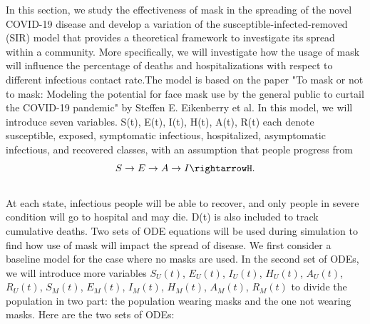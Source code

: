 \documentclass{article}
\begin{document}
In this section, we study the effectiveness of mask in the spreading of the novel COVID-19 disease and develop a variation of the susceptible-infected-removed (SIR) model that provides a theoretical framework to investigate its spread within a community. More specifically, we will investigate how the usage of mask will influence the percentage of deaths and hospitalizations with respect to different infectious contact rate.The model is based on the paper "To mask or not to mask: Modeling the potential for face mask use by the general public to curtail the COVID-19 pandemic" by Steffen E. Eikenberry et al. In this model, we will introduce seven variables. S(t), E(t), I(t), H(t), A(t), R(t) each denote susceptible, exposed, symptomatic infectious, hospitalized, asymptomatic infectious, and recovered classes, with an assumption that people progress from \\
$$S \rightarrow E \rightarrow A \rightarrow I \rightarrowH. $$ \\ 
At each state, infectious people will be able to recover, and only people in severe condition will go to hospital and may die. D(t) is also included to track cumulative deaths. Two sets of ODE equations will be used during simulation to find how use of mask will impact the spread of disease. We first consider a baseline model for the case where no masks are used. In the second set of ODEs, we will introduce more variables
$S_{U}(t)$, $E_{U}(t)$, $I_{U}(t)$, $H_{U}(t)$, $A_{U}(t)$, $R_{U}(t)$, $S_{M}(t)$, $E_{M}(t)$, $I_{M}(t)$, $H_{M}(t)$, $A_{M}(t)$, $R_{M}(t)$ to divide the population in two part: the population wearing masks and the one not wearing masks.
Here are the two sets of ODEs:\\
\end{document}
